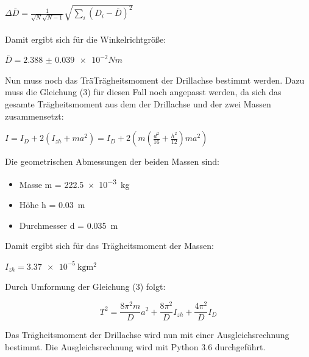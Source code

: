 $\Delta \bar{D} = \frac{1}{\sqrt{N}\sqrt{N-1}} \sqrt{\sum_{i}(D_i-\bar{D})^2}$\\\\


Damit ergibt sich für die Winkelrichtgröße:

\centerline{$\bar{D} = \num{2.388(39)e-2} Nm$}

Nun muss noch das TräTrägheitsmoment der Drillachse bestimmt werden. Dazu muss
die Gleichung (3) für diesen Fall noch angepasst werden, da sich das gesamte
Trägheitsmoment aus dem der Drillachse und der zwei Massen zusammensetzt:

$I = I_D + 2(I_{zh} + ma^2) = I_D + 2(m \left( \frac{d^2}{16} + \frac{h^2}{12} \right)
ma^2)$

Die geometrischen Abmessungen der beiden Massen sind:

\begin{itemize}
  \item Masse m = \SI{222.5e-3}{\kilo\gram}
  \item Höhe h = \SI{0.03}{\meter}
  \item Durchmesser d = \SI{0.035}{\meter}
\end{itemize}

Damit ergibt sich für das Trägheitsmoment der Massen:

\centerline{$I_{zh} = \SI{3.37e-5}{\kilo\gram\meter\squared}$}

Durch Umformung der Gleichung (3) folgt:

\begin{equation}
  T^2 = \frac{8\pi^2m}{D} a^2 + \frac{8\pi^2}{D} I_{zh} + \frac{4\pi^2}{D} I_D
\end{equation}


Das Trägheitsmoment der Drillachse wird nun mit einer Ausgleichsrechnung bestimmt.
Die Ausgleichsrechnung wird mit Python 3.6 durchgeführt.

